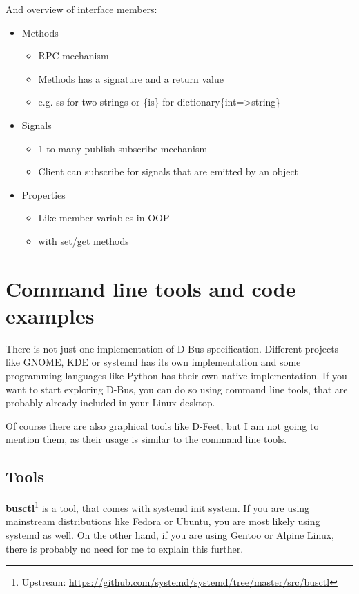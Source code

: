 \documentclass[a4paper,10.5pt]{article}
\begin{document}
And overview of interface members:
\begin{itemize}
  \item Methods
  \begin{itemize}
    \item RPC mechanism
    \item Methods has a signature and a return value
    \item e.g. ss for two strings or \{is\} for dictionary\{int=>string\}
  \end{itemize}
  \item Signals
  \begin{itemize}
    \item 1-to-many publish-subscribe mechanism
    \item Client can subscribe for signals that are emitted by an object
  \end{itemize}
  \item Properties
  \begin{itemize}
    \item Like member variables in OOP
    \item with set/get methods
  \end{itemize}
\end{itemize}


\section{Command line tools and code examples}

There is not just one implementation of D-Bus specification. Different projects like GNOME, KDE or systemd has its own implementation and some programming languages like Python has their own native implementation. If you want to start exploring D-Bus, you can do so using command line tools, that are probably already included in your Linux desktop.

Of course there are also graphical tools like D-Feet, but I am not going to mention them, as their usage is similar to the command line tools.

\subsection{Tools}

\textbf{busctl}\footnote{Upstream: \url{https://github.com/systemd/systemd/tree/master/src/busctl}} is a tool, that comes with systemd init system. If you are using mainstream distributions like Fedora or Ubuntu, you are most likely using systemd as well. On the other hand, if you are using Gentoo or Alpine Linux, there is probably no need for me to explain this further.
\end{document}
